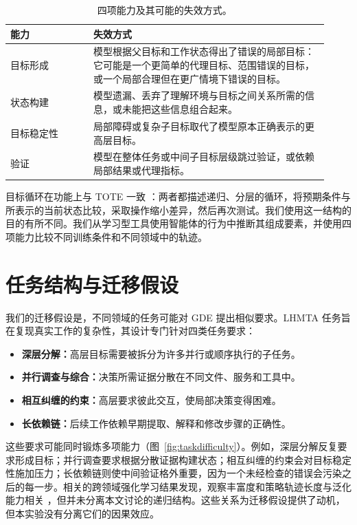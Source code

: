 \documentclass[10pt]{article}
\begin{document}
\begin{table}[H]
\centering
\caption{四项能力及其可能的失效方式。}
\label{tab:capabilities}
\begin{tabular}{p{0.24\linewidth}p{0.68\linewidth}}
\toprule
能力 & 失效方式 \\
\midrule
目标形成 & 模型根据父目标和工作状态得出了错误的局部目标：它可能是一个更简单的代理目标、范围错误的目标，或一个局部合理但在更广情境下错误的目标。 \\
\addlinespace
状态构建 & 模型遗漏、丢弃了理解环境与目标之间关系所需的信息，或未能把这些信息组合起来。 \\
\addlinespace
目标稳定性 & 局部障碍或复杂子目标取代了模型原本正确表示的更高层目标。 \\
\addlinespace
验证 & 模型在整体任务或中间子目标层级跳过验证，或依赖局部结果或代理指标。 \\
\bottomrule
\end{tabular}
\end{table}

目标循环在功能上与 TOTE 一致 \citep{miller1960plans}：两者都描述递归、分层的循环，将预期条件与所表示的当前状态比较，采取操作缩小差异，然后再次测试。我们使用这一结构的目的有所不同。我们从学习型工具使用智能体的行为中推断其组成要素，并使用四项能力比较不同训练条件和不同领域中的轨迹。

\section{任务结构与迁移假设}
\label{sec:taskdesign}

我们的迁移假设是，不同领域的任务可能对 GDE 提出相似要求。LHMTA 任务旨在复现真实工作的复杂性，其设计专门针对四类任务要求：

\begin{itemize}
  \item \textbf{深层分解：}高层目标需要被拆分为许多并行或顺序执行的子任务。
  \item \textbf{并行调查与综合：}决策所需证据分散在不同文件、服务和工具中。
  \item \textbf{相互纠缠的约束：}高层要求彼此交互，使局部决策变得困难。
  \item \textbf{长依赖链：}后续工作依赖早期提取、解释和修改步骤的正确性。
\end{itemize}

这些要求可能同时锻炼多项能力（图~\ref{fig:taskdifficulty}）。例如，深层分解反复要求形成目标；并行调查要求根据分散证据构建状态；相互纠缠的约束会对目标稳定性施加压力；长依赖链则使中间验证格外重要，因为一个未经检查的错误会污染之后的每一步。相关的跨领域强化学习结果发现，观察丰富度和策略轨迹长度与泛化能力相关 \citep{liu2026generalizationtax}，但并未分离本文讨论的递归结构。这些关系为迁移假设提供了动机，但本实验没有分离它们的因果效应。
\end{document}
